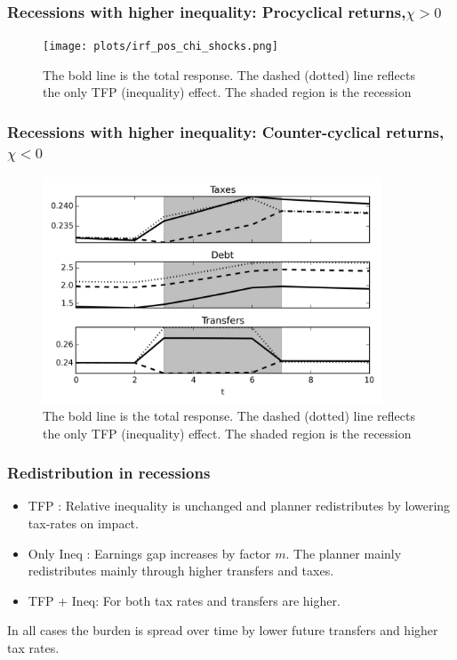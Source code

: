 \documentclass{beamer}
\begin{document}
\begin{frame}
\frametitle{Recessions with higher inequality: Procyclical returns,$\chi>0$}
{
  \begin{figure}
    \centering
    \texttt{[image: plots/irf\_pos\_chi\_shocks.png]}
    \caption{The bold line is the total response. The dashed (dotted) line reflects the only TFP (inequality) effect. The shaded region is the recession}
  \end{figure}

} 
\end{frame}


\begin{frame}
\frametitle{Recessions with higher inequality: Counter-cyclical returns,$\chi<0$}
{
  \begin{figure}
    \centering
    \includegraphics[width = 0.9\textwidth]{plots/irf_negative_chi_shocks.png}
    \caption{The bold line is the total response. The dashed (dotted) line reflects the only TFP (inequality) effect. The shaded region is the recession}
  \end{figure}

} 
\end{frame}

\begin{frame}
\frametitle{Redistribution in recessions}
\begin{itemize}
 \item TFP : Relative inequality is unchanged and planner redistributes by lowering tax-rates on impact.
 \item Only Ineq : Earnings gap increases by factor $m$. The planner mainly redistributes mainly through higher transfers and taxes.
 \item TFP + Ineq: For both tax rates and transfers are higher.
\end{itemize}
In all cases the burden is spread over time by lower future transfers and higher tax rates. 
\end{frame}


 
\end{document}
